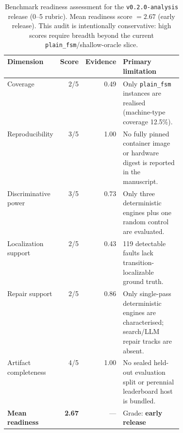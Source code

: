 \begin{table}[t]
\caption{Benchmark readiness assessment for the \texttt{v0.2.0-analysis} release (0--5 rubric).
Mean readiness score $=2.67$ (early release).
This audit is intentionally conservative: high scores require breadth beyond the current \texttt{plain\_fsm}/shallow-oracle slice.}
\label{tab:benchmark-readiness}
\footnotesize
\setlength{\tabcolsep}{4pt}
\begin{tabular}{@{}lrrp{0.42\linewidth}@{}}
\toprule
Dimension & Score & Evidence & Primary limitation \\
\midrule
Coverage & 2/5 & 0.49 & Only \texttt{plain\_fsm} instances are realised (machine-type coverage 12.5\%). \\
Reproducibility & 3/5 & 1.00 & No fully pinned container image or hardware digest is reported in the manuscript. \\
Discriminative power & 3/5 & 0.73 & Only three deterministic engines plus one random control are evaluated. \\
Localization support & 2/5 & 0.43 & 119 detectable faults lack transition-localizable ground truth. \\
Repair support & 2/5 & 0.86 & Only single-pass deterministic engines are characterised; search/LLM repair tracks are absent. \\
Artifact completeness & 4/5 & 1.00 & No sealed held-out evaluation split or perennial leaderboard host is bundled. \\
\midrule
\textbf{Mean readiness} & \textbf{2.67} & --- & Grade: \textbf{early release} \\
\bottomrule
\end{tabular}
\end{table}

